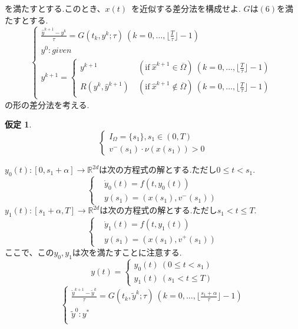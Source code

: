 \documentclass[a4,12pt]{article}
\newtheorem{hyp}{仮定}
\begin{document}
を満たすとする.このとき、$x(t)$ を近似する差分法を構成せよ.
$G$は$(6)$を満たすとする.
\begin{equation}
\begin{cases}
\displaystyle\frac{\hat{y}^{k+1}-y^k}{\tau}=G(t_k,y^k;\tau)\ (k=0,\ldots ,\lfloor\frac{T}{\tau}\rfloor-1)\\
y^0:given\\
y^{k+1}=
\begin{cases}
y^{k+1}\ &(\text{if}\ \hat{x}^{k+1}\in\overline{\Omega})\ (k=0,\ldots ,\lfloor\frac{T}{\tau}\rfloor-1)\\
R(y^k,\hat{y}^{k+1})\ &(\text{if}\ \hat{x}^{k+1}\notin\overline{\Omega})\ (k=0,\ldots ,\lfloor\frac{T}{\tau}\rfloor-1)
\end{cases}
\end{cases}
\end{equation}
の形の差分法を考える.
\begin{hyp}
\[\begin{cases}
I_{\Omega}= \{s_1\},s_1\in (0,T)\\
v^{-}(s_1)\cdot\nu(x(s_1))>0
\end{cases}\]
\end{hyp}
$y_0(t):[0,s_1+\alpha]\rightarrow\mathbb{R}^{2d}$は次の方程式の解とする.ただし$0\leq t<s_1$.
\begin{equation}\left\{\begin{aligned}
    &\dot{y}_0(t)=f(t,y_0(t))\\
    &y(s_1)=(x(s_1),v^{-}(s_1))
    \end{aligned}\right.
\end{equation}
$y_1(t):[s_1+\alpha,T]\rightarrow\mathbb{R}^{2d}$は次の方程式の解とする.ただし$s_1<t\leq T$.
\begin{equation}\left\{\begin{aligned}
    &\dot{y}_1(t)=f(t,y_1(t))\\
    &y(s_1)=(x(s_1),v^{+}(s_1))
    \end{aligned}\right.
\end{equation}
ここで、この$y_0,y_1$は次を満たすことに注意する.
\[y(t)=
\begin{cases}
y_0(t)\ (0\leq t<s_1)\\
y_1(t)\ (s_1<t\leq T)
\end{cases}
\]
\[\begin{cases}
\displaystyle\frac{\tilde{y}^{k+1}-\tilde{y}^k}{\tau}=G(t_k,\tilde{y}^k;\tau)\ (k=0,\ldots ,\lfloor\frac{s_1+\alpha}{\tau}\rfloor-1)\\
\tilde{y}^0:y^*\\
\end{cases}\]
\end{document}
